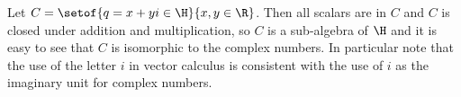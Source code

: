 \documentclass[oneside,12pt]{amsart}
\begin{document}
\begin{remark}
\label{remark:complex_in_quaternions}
Let
$C = \setof{q = x + y i \in \H}{x,y\in \R}$. Then
all scalars are in $C$ and $C$ is closed under addition and multiplication, so $C$ is a sub-algebra of $\H$ and it is
easy to see that $C$ is isomorphic to the complex numbers.
In particular note that the use of the letter $i$ in vector calculus
is consistent with the use of $i$ as the imaginary unit for complex numbers.
\end{remark}







\end{document}
